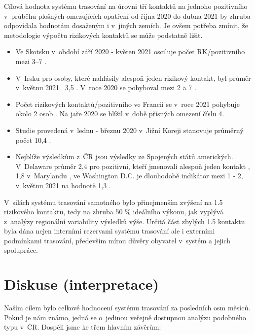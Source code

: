 Cílová hodnota systému trasování na úrovni tří kontaktů na jednoho pozitivního v~průběhu plošných omezujících opatření od října 2020 do dubna 2021 by zhruba odpovídala hodnotám dosaženým i v~jiných zemích. Je ovšem potřeba zmínit, že metodologie výpočtu rizikových kontaktů se může podstatně lišit. 
\begin{itemize}
\item Ve Skotsku v~období září 2020 - květen 2021 osciluje počet RK/pozitivního mezi 3--7 \cite{tr_scotland01}.
\item V~Irsku pro osoby, které nahlásily alespoň jeden rizikový kontakt, byl průměr v~květnu 2021 ~3,5 \cite{tr_irland}. V~roce 2020 se pohyboval mezi 2 a 7 \cite{tr_mcaloon_numbers_2021}.
\item Počet rizikových kontaktů/pozitivního ve Francii se v~roce 2021 pohybuje okolo 2 osob \cite{tr_france}. Na jaře 2020 se blížil v~době přísných omezení číslu 4.
\item Studie provedená v~lednu - březnu 2020 v~Jižní Koreji stanovuje průměrný počet 10,4 \cite{tr_park}.
\item Nejblíže výsledkům z~ČR jsou výsledky ze Spojených států amerických. V~Delaware průměr 2,4 pro pozitivní, kteří jmenovali alespoň jeden kontakt \cite{tr_Delaware}, 1,8 v~Marylandu \cite{tr_maryland01}, ve Washington D.C. je dlouhodobě indikátor mezi 1 - 2, v~květnu 2021 na hodnotě 1,3 \cite{tr_DC}.
\end{itemize}

V~silách systému trasování samotného bylo přinejmenším zvýšení na 1.5 rizikového kontaktu, tedy na zhruba 50 \% ideálního výkonu, jak vyplývá z~analýzy regionální variability výsledků výše. Určitá část zbylých 1.5 kontaktu byla dána nejen interními rezervami systému trasování ale i externími podmínkami trasování, především mírou důvěry obyvatel v~systém a jejich spolupráce.

\section*{Diskuse (interpretace)}

Naším cílem bylo celkové hodnocení systému trasování za posledních osm měsíců. Pokud je nám známo, jedná se o~jedinou veřejně dostupnou analýzu podobného typu v~ČR. Dospěli jsme ke třem hlavním závěrům:

